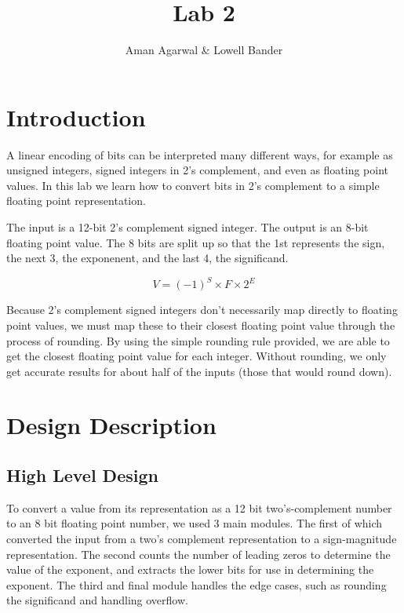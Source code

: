 \documentclass[]{article}
\newcommand{\subtitle}[1]{%
  \posttitle{%
    \par\end{center}
    \begin{center}\large#1\end{center}
    \vskip0.5em}%
}
\begin{document}
\title{Lab 2}
\subtitle{CS M152A}
\author{Aman Agarwal \& Lowell Bander}

\maketitle
\tableofcontents \newpage

\section{Introduction}

A linear encoding of bits can be interpreted many different ways, for example as unsigned integers, signed integers in 2's complement, and even as floating point values. In this lab we learn how to convert bits in 2's complement to a simple floating point representation.

The input is a 12-bit 2's complement signed integer. The output is an 8-bit floating point value. The 8 bits are split up so that the 1st represents the sign, the next 3, the exponenent, and the last 4, the significand.

\begin{displaymath}
V = (-1)^S \times F \times 2^E
\end{displaymath}

Because 2's complement signed integers don't necessarily map directly to floating point values, we must map these to their closest floating point value through the process of rounding. By using the simple rounding rule provided, we are able to get the closest floating point value for each integer. Without rounding, we only get accurate results for about half of the inputs (those that would round down).

\section{Design Description}

\subsection{High Level Design}
\label{subsec:highlevel}

To convert a value from its representation as a 12 bit two's-complement number to an 8 bit floating point number, we used 3 main modules. The first of which converted the input from a two's complement representation to a sign-magnitude representation. The second counts the number of leading zeros to determine the value of the exponent, and extracts the lower bits for use in determining the exponent. The third and final module handles the edge cases, such as rounding the significand and handling overflow.\\
\end{document}
